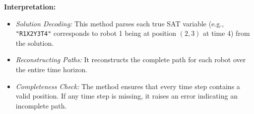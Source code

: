 \documentclass[8pt]{article}
\begin{document}
\textbf{Interpretation:}  
\begin{itemize}
    \item \emph{Solution Decoding:} This method parses each true SAT variable (e.g., \texttt{"R1X2Y3T4"} corresponds to robot 1 being at position $(2,3)$ at time 4) from the solution.
    \item \emph{Reconstructing Paths:} It reconstructs the complete path for each robot over the entire time horizon.
    \item \emph{Completeness Check:} The method ensures that every time step contains a valid position. If any time step is missing, it raises an error indicating an incomplete path.
\end{itemize}
\end{document}
